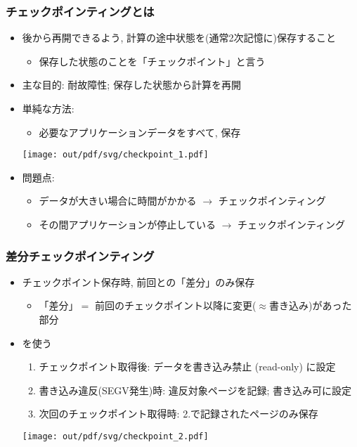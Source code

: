 \documentclass[12pt,dvipdfmx]{beamer}
\begin{document}
\begin{frame}
  \frametitle{チェックポインティングとは}
  \begin{itemize}
  \item 後から再開できるよう, 計算の途中状態を(通常2次記憶に)保存すること
    \begin{itemize}
    \item 保存した状態のことを「チェックポイント」と言う
    \end{itemize}
  \item 主な目的: 耐故障性; 保存した状態から計算を再開
  \item 単純な方法:
    \begin{itemize}
    \item 必要なアプリケーションデータをすべて, 保存
    \end{itemize}

    \begin{center}
      \texttt{[image: out/pdf/svg/checkpoint\_1.pdf]}      
    \end{center}

  \item 問題点:
    \begin{itemize}
    \item データが大きい場合に時間がかかる $\rightarrow$ チェックポインティング
    \item その間アプリケーションが停止している
      $\rightarrow$ チェックポインティング
    \end{itemize}
  \end{itemize}
\end{frame}

\begin{frame}
  \frametitle{差分チェックポインティング}
  \begin{itemize}
  \item チェックポイント保存時, 前回との「差分」のみ保存
    \begin{itemize}
    \item 「差分」$=$ 前回のチェックポイント以降に変更($\approx$書き込み)があった部分
    \end{itemize}
  \item {}を使う
    \begin{enumerate}
    \item チェックポイント取得後: データを書き込み禁止 (read-only) に設定
    \item 書き込み違反(SEGV発生)時: 違反対象ページを記録; 書き込み可に設定
    \item 次回のチェックポイント取得時: 2.で記録されたページのみ保存
    \end{enumerate}
    \begin{center}
      \texttt{[image: out/pdf/svg/checkpoint\_2.pdf]}
    \end{center}
  \end{itemize}
\end{frame}
\end{document}
